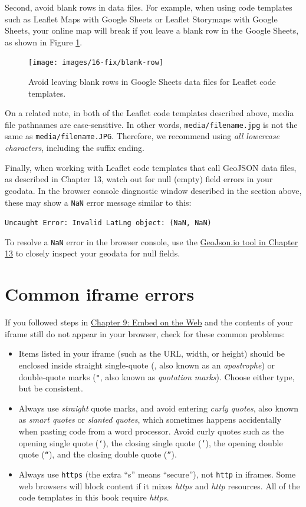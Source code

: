 \documentclass[
  english,
]{book}
\begin{document}
Second, avoid blank rows in data files. For example, when using code templates such as Leaflet Maps with Google Sheets or Leaflet Storymaps with Google Sheets, your online map will break if you leave a blank row in the Google Sheets, as shown in Figure \ref{fig:blank-row}.



\begin{figure}
\texttt{[image: images/16-fix/blank-row]} \caption{Avoid leaving blank rows in Google Sheets data files for Leaflet code templates.}\label{fig:blank-row}
\end{figure}

On a related note, in both of the Leaflet code templates described above, media file pathnames are case-sensitive. In other words, \texttt{media/filename.jpg} is not the same as \texttt{media/filename.JPG}. Therefore, we recommend using \emph{all lowercase characters}, including the suffix ending.

Finally, when working with Leaflet code templates that call GeoJSON data files, as described in Chapter 13, watch out for null (empty) field errors in your geodata. In the browser console diagnostic window described in the section above, these may show a \texttt{NaN} error message similar to this:

\texttt{Uncaught\ Error:\ Invalid\ LatLng\ object:\ (NaN,\ NaN)}

To resolve a \texttt{NaN} error in the browser console, use the \href{geojsonio.html}{GeoJson.io tool in Chapter 13} to closely inspect your geodata for null fields.

\hypertarget{fix-iframe}{%
\section{Common iframe errors}\label{fix-iframe}}

If you followed steps in \href{embed.html}{Chapter 9: Embed on the Web} and the contents of your iframe still do not appear in your browser, check for these common problems:

\begin{itemize}
\item
  Items listed in your iframe (such as the URL, width, or height) should be enclosed inside straight single-quote (\texttt{\textquotesingle{}}, also known as an \emph{apostrophe}) or double-quote marks (\texttt{"}, also known as \emph{quotation marks}). Choose either type, but be consistent.
\item
  Always use \emph{straight} quote marks, and avoid entering \emph{curly quotes}, also known as \emph{smart quotes} or \emph{slanted quotes}, which sometimes happens accidentally when pasting code from a word processor. Avoid curly quotes such as the opening single quote (\texttt{‘}), the closing single quote (\texttt{’}), the opening double quote (\texttt{“}), and the closing double quote (\texttt{”}).
\item
  Always use \texttt{https} (the extra ``s'' means ``secure''), not \texttt{http} in iframes. Some web browsers will block content if it mixes \emph{https} and \emph{http} resources. All of the code templates in this book require \emph{https}.
\end{itemize}
\end{document}

